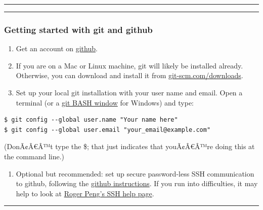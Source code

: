 \documentclass[]{article}
\newcommand{\euro}{€}
\providecommand{\tightlist}{%
  \setlength{\itemsep}{0pt}\setlength{\parskip}{0pt}}
\begin{document}
\begin{center}\rule{0.5\linewidth}{\linethickness}\end{center}

\begin{center}\rule{0.5\linewidth}{\linethickness}\end{center}

\subsubsection{Getting started with git and
github}\label{getting-started-with-git-and-github}

\begin{enumerate}
\def\labelenumi{\arabic{enumi}.}
\item
  Get an account on \href{http://github.com}{github}.
\item
  If you are on a Mac or Linux machine, git will likely be installed
  already. Otherwise, you can download and install it from
  \href{http://git-scm.com/downloads}{git-scm.com/downloads}.
\item
  Set up your local git installation with your user name and email. Open
  a terminal (or a \href{https://git-for-windows.github.io}{git BASH
  window} for Windows) and type:
\end{enumerate}

\begin{verbatim}
$ git config --global user.name "Your name here"
$ git config --global user.email "your_email@example.com"
\end{verbatim}

(DonÃ¢Â\euro{}Â™t type the \$; that just indicates that
youÃ¢Â\euro{}Â™re doing this at the command line.)

\begin{enumerate}
\def\labelenumi{\arabic{enumi}.}
\setcounter{enumi}{3}
\tightlist
\item
  Optional but recommended: set up secure password-less SSH
  communication to github, following the
  \href{https://help.github.com/articles/connecting-to-github-with-ssh}{github
  instructions}. If you run into difficulties, it may help to look at
  \href{http://www.biostat.jhsph.edu/bit/nopassword.html}{Roger Peng's
  SSH help page}.
\end{enumerate}

\begin{center}\rule{0.5\linewidth}{\linethickness}\end{center}
\end{document}

